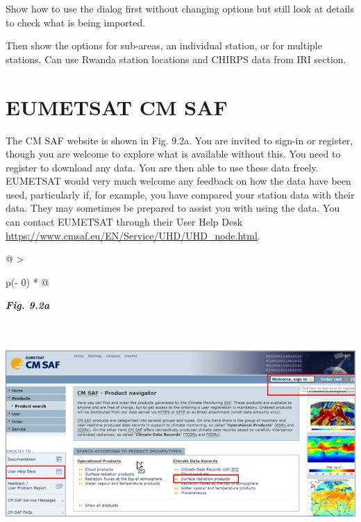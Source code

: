 \documentclass[
  letterpaper,
  DIV=11,
  numbers=noendperiod]{scrreprt}
\begin{document}
Show how to use the dialog first without changing options but still look
at details to check what is being imported.

Then show the options for sub-areas, an individual station, or for
multiple stations. Can use Rwanda station locations and CHIRPS data from
IRI section.

\section{EUMETSAT CM SAF}\label{eumetsat-cm-saf}

The CM SAF website is shown in Fig. 9.2a. You are invited to sign-in or
register, though you are welcome to explore what is available without
this. You need to register to download any data. You are then able to
use these data freely. EUMETSAT would very much welcome any feedback on
how the data have been used, particularly if, for example, you have
compared your station data with their data. They may sometimes be
prepared to assist you with using the data. You can contact EUMETSAT
through their User Help Desk
\href{https://www.cmsaf.eu/EN/Service/UHD/UHD_node.html}{\ul{https://www.cmsaf.eu/EN/Service/UHD/UHD\_node.html}}.

\begin{longtable}[]{@{}
  >{\raggedright\arraybackslash}p{(\columnwidth - 0\tabcolsep) * }@{}}
\toprule\noalign{}
\begin{minipage}[b]{\linewidth}\raggedright
\textbf{\emph{Fig. 9.2a}}
\end{minipage} \\
\midrule\noalign{}
\endhead
\bottomrule\noalign{}
\endlastfoot
\includegraphics[width=6.26806in,height=2.93819in]{figures/Fig9.2a.png} \\
\end{longtable}
\end{document}
